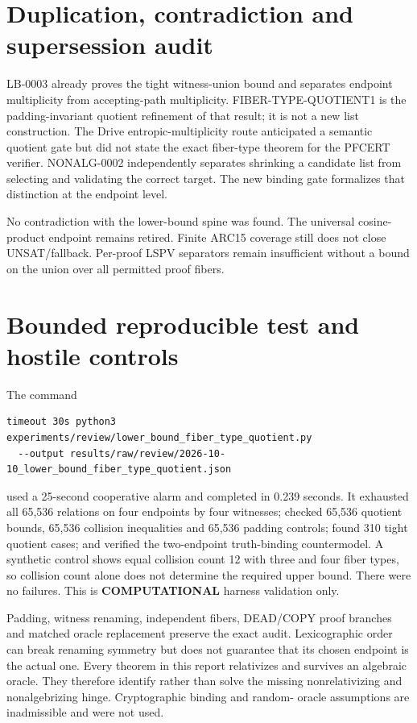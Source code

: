 \documentclass[11pt]{article}
\begin{document}
\section{Duplication, contradiction and supersession audit}
LB-0003 already proves the tight witness-union bound and separates endpoint
multiplicity from accepting-path multiplicity.  FIBER-TYPE-QUOTIENT1 is the
padding-invariant quotient refinement of that result; it is not a new list
construction.  The Drive entropic-multiplicity route anticipated a semantic
quotient gate but did not state the exact fiber-type theorem for the PFCERT
verifier.  NONALG-0002 independently separates shrinking a candidate list
from selecting and validating the correct target.  The new binding gate
formalizes that distinction at the endpoint level.

No contradiction with the lower-bound spine was found.  The universal
cosine-product endpoint remains retired.  Finite ARC15 coverage still does
not close UNSAT/fallback.  Per-proof LSPV separators remain insufficient
without a bound on the union over all permitted proof fibers.

\section{Bounded reproducible test and hostile controls}
The command
\begin{verbatim}
timeout 30s python3 experiments/review/lower_bound_fiber_type_quotient.py
  --output results/raw/review/2026-10-10_lower_bound_fiber_type_quotient.json
\end{verbatim}
used a 25-second cooperative alarm and completed in 0.239 seconds.  It
exhausted all 65,536 relations on four endpoints by four witnesses; checked
65,536 quotient bounds, 65,536 collision inequalities and 65,536 padding
controls; found 310 tight quotient cases; and verified the two-endpoint
truth-binding countermodel.  A synthetic control shows equal collision
count 12 with three and four fiber types, so collision count alone does not
determine the required upper bound.  There were no failures.  This is
\textbf{COMPUTATIONAL} harness validation only.

Padding, witness renaming, independent fibers, DEAD/COPY proof branches and
matched oracle replacement preserve the exact audit.  Lexicographic order
can break renaming symmetry but does not guarantee that its chosen endpoint
is the actual one.  Every theorem in this report relativizes and survives an
algebraic oracle.  They therefore identify rather than solve the missing
nonrelativizing and nonalgebrizing hinge.  Cryptographic binding and random-
oracle assumptions are inadmissible and were not used.
\end{document}
